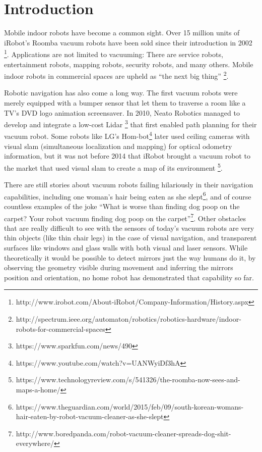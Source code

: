 \section{Introduction}\label{introduction}

Mobile indoor robots have become a common sight. Over 15 million units
of iRobot's Roomba vacuum robots have been sold since their introduction
in 2002
\footnote{http://www.irobot.com/About-iRobot/Company-Information/History.aspx}.
Applications are not limited to vacuuming: There are service robots,
entertainment robots, mapping robots, security robots, and many others.
Mobile indoor robots in commercial spaces are upheld as ``the next big
thing''
\footnote{http://spectrum.ieee.org/automaton/robotics/robotics-hardware/indoor-robots-for-commercial-spaces}.

Robotic navigation has also come a long way. The first vacuum robots
were merely equipped with a bumper sensor that let them to traverse a
room like a TV's DVD logo animation screensaver. In 2010, Neato Robotics
managed to develop and integrate a low-cost Lidar
\footnote{https://www.sparkfun.com/news/490} that first enabled path
planning for their vacuum robot. Some robots like LG's
Hom-bot\footnote{https://www.youtube.com/watch?v=UANWyiDf3hA} later used
ceiling cameras with visual slam (simultaneous localization and mapping)
for optical odometry information, but it was not before 2014 that iRobot
brought a vacuum robot to the market that used visual slam to create a
map of its environment
\footnote{https://www.technologyreview.com/s/541326/the-roomba-now-sees-and-maps-a-home/}.

There are still stories about vacuum robots failing hilariously in their
navigation capabilities, including one woman's hair being eaten as she
slept\footnote{https://www.theguardian.com/world/2015/feb/09/south-korean-womans-hair-eaten-by-robot-vacuum-cleaner-as-she-slept},
and of course countless examples of the joke ``What is worse than
finding dog poop on the carpet? Your robot vacuum finding dog poop on
the
carpet''\footnote{http://www.boredpanda.com/robot-vacuum-cleaner-spreads-dog-shit-everywhere/}.
Other obstacles that are really difficult to see with the sensors of
today's vacuum robots are very thin objects (like thin chair legs) in
the case of visual navigation, and transparent surfaces like windows and
glass walls with both visual and laser sensors. While theoretically it
would be possible to detect mirrors just the way humans do it, by
observing the geometry visible during movement and inferring the mirrors
position and orientation, no home robot has demonstrated that capability
so far.

